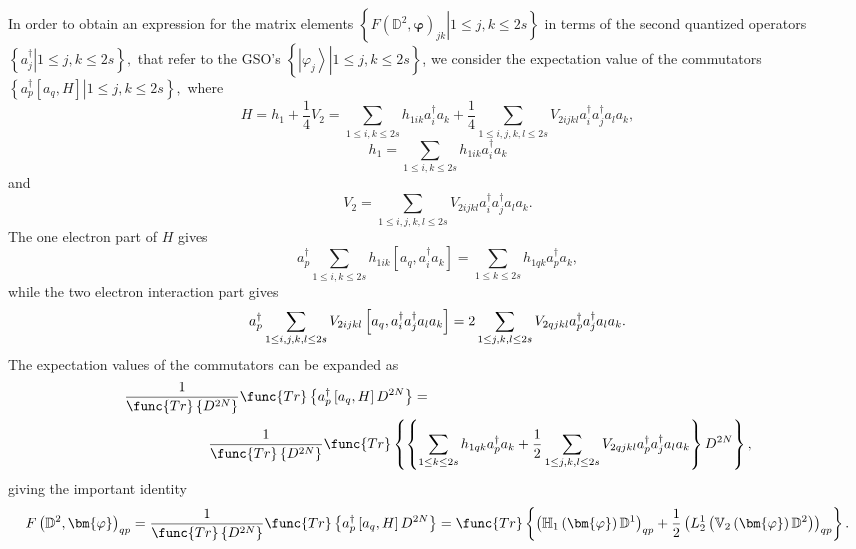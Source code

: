 \documentclass{preprint}
\begin{document}
In order to obtain an expression for the matrix elements $\left\{ \left.
F\left( \mathbb{D}^{2},\bm{\varphi}\right) _{jk}\right\vert 1\leq
j,k\leq2s\right\} $ in terms of the second quantized operators $\left\{
\left. a_{j}^{\dagger}\right\vert 1\leq j,k\leq2s\right\} ,$ that refer to
the GSO's $\left\{ \left. \left\vert \varphi_{j}\right\rangle \right\vert
1\leq j,k\leq2s\right\} $, we consider the expectation value of the
commutators $\left\{ \left. a_{p}^{\dagger}\left[ a_{q},H\right] \right\vert
1\leq j,k\leq2s\right\} ,$ where
\begin{equation}
H=h_{1}+\frac{1}{4}V_{2}=\sum_{1\leq i,k\leq2s}h_{1ik}a_{i}^{\dagger}a_{k}+%
\frac{1}{4}\sum_{1\leq
i,j,k,l\leq2s}V_{2ijkl}a_{i}^{\dagger}a_{j}^{\dagger}a_{l}a_{k},
\end{equation}%
\begin{equation}
h_{1}=\sum_{1\leq i,k\leq2s}h_{1ik}a_{i}^{\dagger}a_{k}
\end{equation}
and
\begin{equation}
V_{2}=\sum_{1\leq
i,j,k,l\leq2s}V_{2ijkl}a_{i}^{\dagger}a_{j}^{\dagger}a_{l}a_{k}.
\end{equation}
The one electron part of $H$ gives
\begin{equation}
a_{p}^{\dagger}\sum_{1\leq i,k\leq2s}h_{1ik}\left[ a_{q},a_{i}^{\dagger}a_{k}%
\right] =\sum_{1\leq k\leq2s}h_{1qk}a_{p}^{\dagger}a_{k},
\end{equation}
while the two electron interaction part gives
\begin{equation}
a_{p}^{\dagger}\sum_{1\leq i,j,k,l\leq2s}V_{2ijkl}\left[ a_{q},a_{i}^{%
\dagger}a_{j}^{\dagger}a_{l}a_{k}\right] =2\sum_{1\leq j,k,l\leq
2s}V_{2qjkl}a_{p}^{\dagger}a_{j}^{\dagger}a_{l}a_{k}.
\end{equation}
The expectation values of the commutators can be expanded as
\begin{align}
& \frac{1}{\func{Tr}\left\{ D^{2N}\right\} }\func{Tr}\left\{ a_{p}^{\dagger}%
\left[ a_{q},H\right] D^{2N}\right\} =  \notag \\
& \qquad\qquad\qquad\frac{1}{\func{Tr}\left\{ D^{2N}\right\} }\func{Tr}%
\left\{ \left\{ \sum_{1\leq k\leq2s}h_{1qk}a_{p}^{\dagger }a_{k}+\frac{1}{2}%
\sum_{1\leq
j,k,l\leq2s}V_{2qjkl}a_{p}^{\dagger}a_{j}^{\dagger}a_{l}a_{k}\right\}
D^{2N}\right\} ,
\end{align}
giving the important identity
\begin{equation}
F\left( \mathbb{D}^{2},\bm{\varphi}\right) _{qp}=\frac{1}{\func{Tr}\left\{
D^{2N}\right\} }\func{Tr}\left\{ a_{p}^{\dagger}\left[ a_{q},H\right]
D^{2N}\right\} =\func{Tr}\left\{ \left( \mathbb{H}_{1}\left( \bm{\varphi}%
\right) \mathbb{D}^{1}\right) _{qp}+\frac{1}{2}\left( L_{2}^{1}\left(
\mathbb{V}_{2}\left( \bm{\varphi}\right) \mathbb{D}^{2}\right) \right)
_{qp}\right\} .  \label{Fockelem}
\end{equation}
\end{document}
